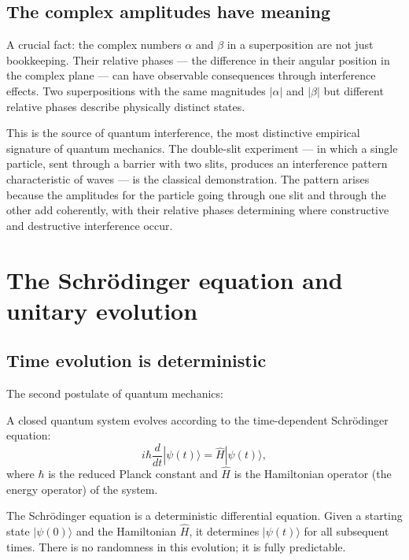 \subsection{The complex amplitudes have meaning}

A crucial fact: the complex numbers $\alpha$ and $\beta$ in a
superposition are not just bookkeeping. Their relative phases ---
the difference in their angular position in the complex plane --- can
have observable consequences through interference effects. Two
superpositions with the same magnitudes $|\alpha|$ and $|\beta|$ but
different relative phases describe physically distinct states.

This is the source of quantum interference, the most distinctive
empirical signature of quantum mechanics. The double-slit experiment
--- in which a single particle, sent through a barrier with two
slits, produces an interference pattern characteristic of waves ---
is the classical demonstration. The pattern arises because the
amplitudes for the particle going through one slit and through the
other add coherently, with their relative phases determining where
constructive and destructive interference occur.

\section{The Schr\"odinger equation and unitary evolution}
\label{sec:schrodinger}

\subsection{Time evolution is deterministic}

The second postulate of quantum mechanics:

\begin{principlebox}
A closed quantum system evolves according to the time-dependent
Schr\"odinger equation:
\[
    i\hbar \frac{d}{dt} |\psi(t)\rangle = \hat{H} |\psi(t)\rangle,
\]
where $\hbar$ is the reduced Planck constant and $\hat{H}$ is the
Hamiltonian operator (the energy operator) of the system.
\end{principlebox}

The Schr\"odinger equation is a deterministic differential equation.
Given a starting state $|\psi(0)\rangle$ and the Hamiltonian
$\hat{H}$, it determines $|\psi(t)\rangle$ for all subsequent times.
There is no randomness in this evolution; it is fully predictable.

